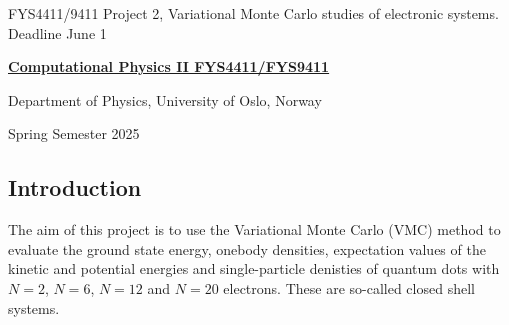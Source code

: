 \documentclass[%
oneside,                 %
final,                   %
10pt]{article}
\begin{document}

\newcommand{\exercisesection}[1]{\subsection*{#1}}






\thispagestyle{empty}

\begin{center}
{\LARGE\bf
\begin{spacing}{1.25}
FYS4411/9411 Project 2, Variational Monte Carlo studies of electronic systems. Deadline June 1
\end{spacing}
}
\end{center}


\begin{center}
{\bf \href{{http://www.uio.no/studier/emner/matnat/fys/FYS4411/index-eng.html}}{Computational Physics II FYS4411/FYS9411}}
\end{center}

    \begin{center}
\centerline{{\small Department of Physics, University of Oslo, Norway}}
\end{center}
    

\begin{center}
Spring Semester 2025
\end{center}

\vspace{1cm}


\subsection*{Introduction}

The aim of this project is to use the Variational Monte
Carlo (VMC) method to evaluate 
the ground state energy, onebody densities, expectation values of the kinetic and potential energies 
 and single-particle denisties of 
quantum dots with $N=2$, $N=6$, $N=12$ and $N=20$ electrons. These are so-called closed shell systems.
\end{document}

